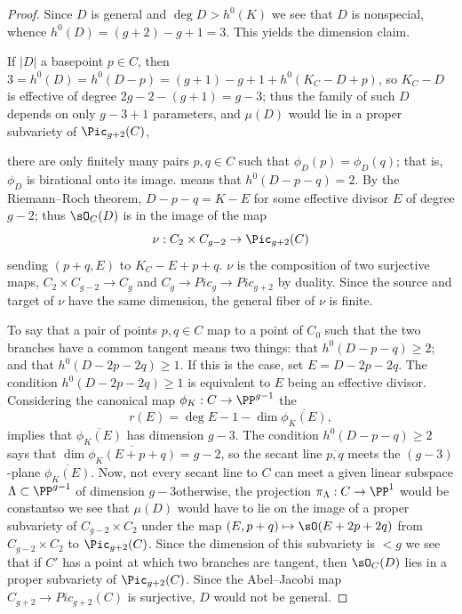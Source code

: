 \begin{proof}
Since $D$ is general and $\deg D > h^{0}(K)$ we see
that $D$ is nonspecial, whence $h^0(D) = (g+2)-g+1 = 3$.
This yields the dimension claim.

If $|D|$ 
a basepoint $p\in C$, then $3=h^0(D)
= h^0(D-p) = (g+1)-g+1+h^0(K_C-D+p)$,
so $K_C-D$ is effective of degree $2g-2-(g+1) =g-3$; thus the family of
such $D$ depends on only $g-3+1$ parameters,
and $\mu(D)$ would lie in a proper subvariety of $\Pic_{g+2}(C)$,

there are only finitely many pairs $p,
q \in C$ such that $\phi_D(p) = \phi_D(q)$; that is, $\phi_D$
is birational onto its image. 
 means that $h^0(D-p-q) = 2$. By the Riemann--Roch
 theorem, $D-p-q = K-E$ for some effective divisor $E$ of degree $g-2$;
 thus $\sO_C(D)$ is in the image of the map
$$
\nu : C_2 \times C_{g-2} \to \Pic_{g+2}(C)
$$
sending $(p+q, E)$ to $K_C - E + p + q$.
$\nu$ is
the composition of two surjective maps, $C_2 \times C_{g-2} \to C_g$
and $C_g\to Pic_g \to Pic_{g+2}$ by duality. Since the source and
target of $\nu$ have the same dimension, the general fiber of $\nu$ is
finite. 

To say that a pair of points $p, q \in C$ map to
a point of $C_0$ such that the
two branches have a common tangent means two things: that $h^0(D-p-q)
\geq 2$; and that $h^0(D-2p-2q) \geq 1$. If this is the case, set $E =
D - 2p - 2q$.  The condition $h^0(D-2p-2q) \geq 1$ is equivalent to
$E$ being an effective divisor. Considering the canonical map $\phi_K:
C\to \PP^{g-1}$
the 
%
$$r(E) = \deg E -1-\dim\overline{\phi_K(E)},$$ 
implies that $\overline {\phi_K(E)}$ has
dimension $g-3$. The 
condition $h^0(D-p-q) \geq 2$ says that
$\dim\overline{\phi_K(E+p+q)} = g-2$,
so the secant line $\overline{p,q}$ meets the $(g-3)$-plane
$\overline{\phi_K(E)}$. Now, not every secant line to $C$ can meet
a given linear subspace $\Lambda \subset \PP^{g-1}$ of dimension
$g-3$\emdash otherwise, the projection $\pi_\Lambda : C \to \PP^1$ would
be constant\emdash so we see that $\mu(D)$ would have to lie on the image
of a proper subvariety of $C_{g-2} \times C_2$ under the map $(E, p+q)
\mapsto \sO(E+2p+2q)$ from $C_{g-2} \times C_2$ to $\Pic_{g+2}(C)$.
Since the dimension of this subvariety is $<g$ we see that if $C'$ has
a point at which two branches are tangent, then $\sO_C(D)$ lies in a
proper subvariety of $\Pic_{g+2}(C)$. Since
the Abel--Jacobi map $C_{g+2} \to Pic_{g+2}(C)$ is surjective,
 $D$ would not be general.


\end{proof}
